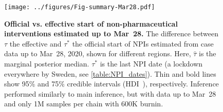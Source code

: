 \documentclass[12pt]{extarticle}
\begin{document}
\begin{figure}[b!]
    \centering
	\texttt{[image: ../figures/Fig-summary-Mar28.pdf]}
    \caption{
    \textbf{Official vs. effective start of non-pharmaceutical interventions estimated up to Mar~28.}
    	The difference between $\tau$ the effective and $\tau^*$ the official start of NPIs estimated from case data up to Mar~28, 2020, shown for different regions. Here, $\hat{\tau}$ is the marginal posterior median. $\tau^*$ is the last NPI date (a lockdown everywhere by Sweden, see \autoref{table:NPI_dates}). Thin and bold lines show 95\% and 75\% credible intervals (HDI~\citep{Kruschke2015}), respectively. Inference performed similarly to main inference, but with data up to Mar~28 and only 1M samples per chain with 600K burnin.
    }
    \label{fig:tau-summary-mar28}
\end{figure}
 
\end{document}
